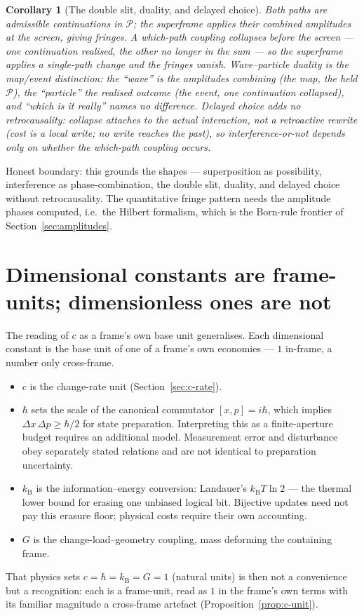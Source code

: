 \documentclass[11pt,a4paper]{article}
\newtheorem{corollary}[definition]{Corollary}
\theoremstyle{remark}\newtheorem{remark}[definition]{Remark}
\begin{document}
\begin{corollary}[The double slit, duality, and delayed choice]\label{cor:doubleslit}
Both paths are admissible continuations in $\mathcal P$; the superframe applies
their combined amplitudes at the screen, giving fringes. A which-path coupling
collapses before the screen --- one continuation realised, the other no longer in
the sum --- so the superframe applies a single-path change and the fringes vanish.
Wave--particle duality is the map/event distinction: the ``wave'' is the amplitudes
combining (the map, the held $\mathcal P$), the ``particle'' the realised outcome
(the event, one continuation collapsed), and ``which is it really'' names no
difference. Delayed choice adds no retrocausality: collapse attaches to the actual
interaction, not a retroactive rewrite (cost is a local write; no write reaches
the past), so interference-or-not depends only on whether the which-path coupling
occurs.
\end{corollary}

Honest boundary: this grounds the shapes --- superposition as possibility,
interference as phase-combination, the double slit, duality, and delayed choice
without retrocausality. The quantitative fringe pattern needs the amplitude phases
computed, i.e.\ the Hilbert formalism, which is the Born-rule frontier of
Section~\ref{sec:amplitudes}.

\section{Dimensional constants are frame-units; dimensionless ones are not}\label{sec:constants}
The reading of $c$ as a frame's own base unit generalises. Each dimensional
constant is the base unit of one of a frame's own economies --- $1$ in-frame, a
number only cross-frame.
\begin{itemize}[leftmargin=*]
\item $c$ is the change-rate unit (Section~\ref{sec:c-rate}).
\item $\hbar$ sets the scale of the canonical commutator
$[x,p]=i\hbar$, which implies $\Delta x\,\Delta p\ge\hbar/2$
for state preparation. Interpreting this as a finite-aperture budget requires
an additional model. Measurement error and disturbance obey separately stated
relations and are not identical to preparation uncertainty.
\item $k_{\mathrm B}$ is the information--energy conversion: Landauer's
$k_{\mathrm B}T\ln 2$ \citep{landauer1961} --- the thermal lower bound for erasing one unbiased logical bit. Bijective updates need not pay this erasure floor; physical costs require their own accounting.
\item $G$ is the change-load--geometry coupling, mass deforming the containing
frame.
\end{itemize}
That physics sets $c=\hbar=k_{\mathrm B}=G=1$ (natural units) is then not a
convenience but a recognition: each is a frame-unit, read as $1$ in the frame's
own terms with its familiar magnitude a cross-frame artefact
(Proposition~\ref{prop:c-unit}).
\end{document}
